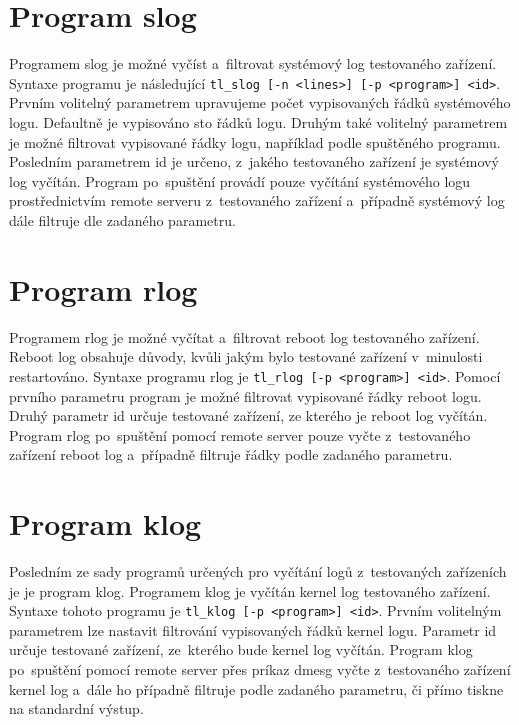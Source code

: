 \section{Program slog}
Programem slog je možné vyčíst a~filtrovat systémový log testovaného zařízení. Syntaxe programu je následující \texttt{tl\_slog [-n <lines>] [-p <program>] <id>}. Prvním volitelný parametrem upravujeme počet vypisovaných řádků systémového logu. Defaultně je vypisováno sto řádků logu. Druhým také volitelný parametrem je možné filtrovat vypisované řádky logu, například podle spuštěného programu. Posledním parametrem id je určeno, z~jakého testovaného zařízení je systémový log vyčítán. Program po~spuštění provádí pouze vyčítání systémového logu prostřednictvím remote serveru z~testovaného zařízení a~případně systémový log dále filtruje dle zadaného parametru.

\section{Program rlog}
Programem rlog je možné vyčítat a~filtrovat reboot log testovaného zařízení. Reboot log obsahuje důvody, kvůli jakým bylo testované zařízení v~minulosti restartováno. Syntaxe programu rlog je \texttt{tl\_rlog [-p <program>] <id>}. Pomocí prvního parametru program je možné filtrovat vypisované řádky reboot logu. Druhý parametr id určuje testované zařízení, ze kterého je reboot log vyčítán. Program rlog po~spuštění pomocí remote server pouze vyčte z~testovaného zařízení reboot log a~případně filtruje řádky podle zadaného parametru.

\section{Program klog}
Posledním ze sady programů určených pro vyčítání logů z~testovaných zařízeních je je program klog. Programem klog je vyčítán kernel log testovaného zařízení. Syntaxe tohoto programu je \texttt{tl\_klog [-p <program>] <id>}. Prvním volitelným parametrem lze nastavit filtrování vypisovaných řádků kernel logu. Parametr id určuje testované zařízení, ze~kterého bude kernel log vyčítán. Program klog po~spuštění pomocí remote server přes príkaz dmesg vyčte z~testovaného zařízení kernel log a~dále ho případně filtruje podle zadaného parametru, či přímo tiskne na standardní výstup.


